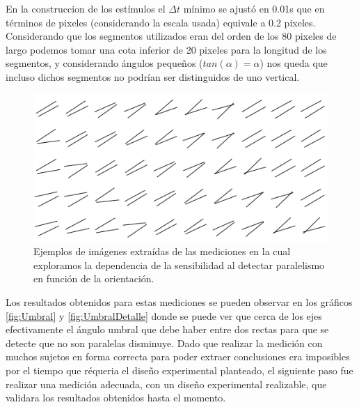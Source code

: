 \documentclass{article}
\begin{document}
    En la construccion de los estímulos el $\Delta t$ mínimo se ajustó en 0.01s que en términos de pixeles (considerando la escala usada) equivale a 0.2 pixeles. Considerando que los segmentos utilizados eran del orden de los 80 pixeles de largo podemos tomar una cota inferior de 20 pixeles para la longitud de los segmentos, y considerando ángulos pequeños ($tan(\alpha)=\alpha$) nos queda que incluso dichos segmentos no podrían ser distinguidos de uno vertical. 
    
    \begin{figure}
        \center
        \includegraphics[width=\textwidth]{Imagenes/ImagenesDesarrollo2.png}
        \caption{Ejemplos de imágenes extraídas de las mediciones en la cual exploramos la dependencia de la sensibilidad al detectar paralelismo en función de la orientación.}
        \label{fig:ImagenesDesarrollo2}
    \end{figure}  
    
    Los resultados obtenidos para estas mediciones se pueden observar en los gráficos \ref{fig:Umbral} y \ref{fig:UmbralDetalle} donde se puede ver que cerca de los ejes efectivamente el ángulo umbral que debe haber entre dos rectas para que se detecte que no son paralelas disminuye. Dado que realizar la medición con muchos sujetos en forma correcta para poder extraer conclusiones era imposibles por el tiempo que réqueria el diseño experimental planteado, el siguiente paso fue realizar una medición adecuada, con un diseño experimental realizable, que validara los resultados obtenidos hasta el momento.
    
\end{document}
